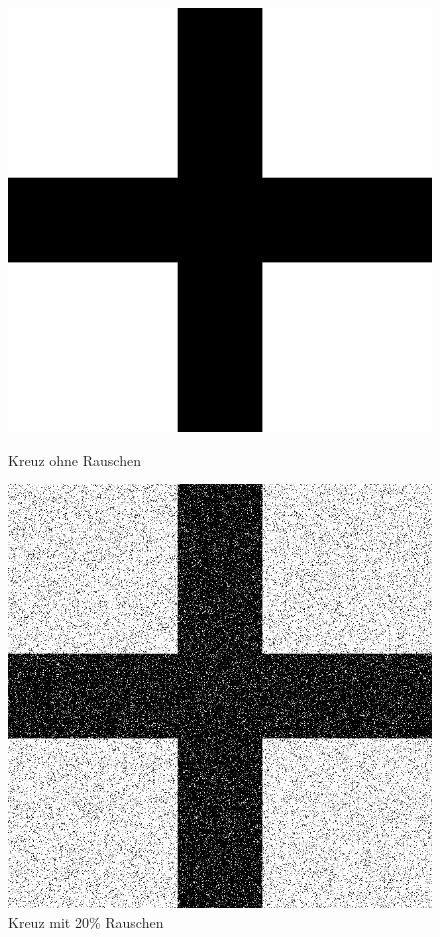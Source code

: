 \begin{figure}[hbt]
	\begin{minipage}{0.49 \textwidth}
		\includegraphics[width=\textwidth]{./Bilder/Auswertung/BeispielBilder/Picture_Crossing_noise_0_pixelCnt_128_featureCnt_5}
		\caption{Kreuz ohne Rauschen}
	\end{minipage}
	\hfill
	\begin{minipage}{0.49 \textwidth}
		\includegraphics[width=\textwidth]{./Bilder/Auswertung/BeispielBilder/Picture_Crossing_noise_20_pixelCnt_128_featureCnt_5}
		\caption{Kreuz mit 20\% Rauschen}
	\end{minipage}
\end{figure}

